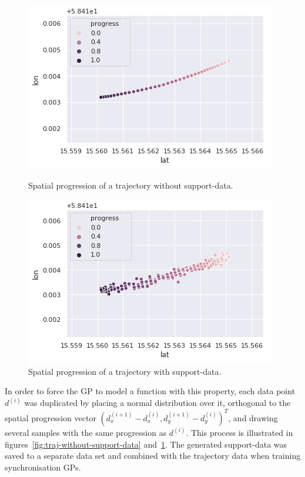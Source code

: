 \begin{figure}[H]
  \begin{minipage}{.46\textwidth}
    \includegraphics[scale=0.48,width=\textwidth]{figures/traj-without-support-data2.png}
    \caption{Spatial progression of a trajectory without support-data.}
    \label{fig:traj-without-support-data}
  \end{minipage}
  \hspace{5pt}
  \begin{minipage}{.46\textwidth}
    \includegraphics[scale=0.5,width=\textwidth]{figures/traj-with-support-data2.png}
    \caption{Spatial progression of a trajectory with support-data.}
    \label{fig:traj-with-support-data}
  \end{minipage}
\end{figure}

\noindent
In order to force the GP to model a function with this property, each data point $d^{(i)}$ was duplicated by placing a normal distribution over it, orthogonal to the spatial progression vector ${(d^{(i+1)}_x - d^{(i)}_x, d^{(i+1)}_y - d^{(i)}_y)}^T$, and drawing several samples with the same progression as $d^{(i)}$. This process is illustrated in figures~\ref{fig:traj-without-support-data} and~\ref{fig:traj-with-support-data}. The generated support-data was saved to a separate data set and combined with the trajectory data when training synchronisation GPs.

